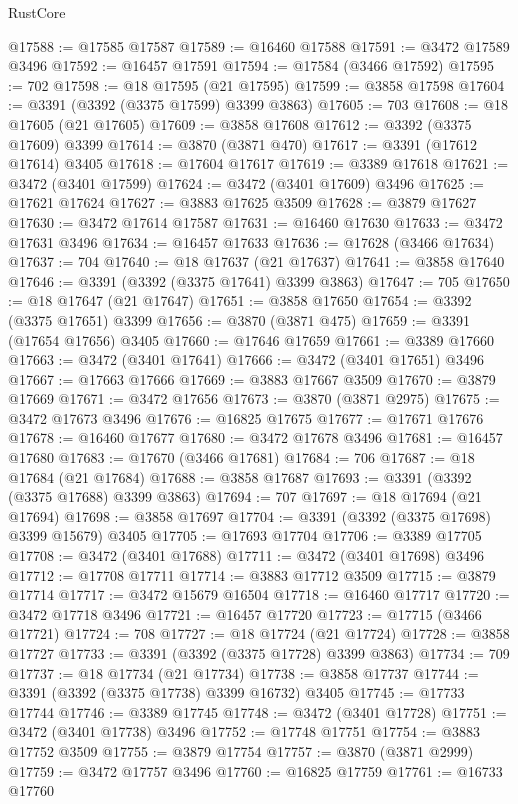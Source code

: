 \begin{lexlean}{RustCore}
\begin{coremodule}
@17588 := @17585 @17587
@17589 := @16460 @17588
@17591 := @3472 @17589 @3496
@17592 := @16457 @17591
@17594 := @17584 (@3466 @17592)
@17595 := 702
@17598 := @18 @17595 (@21 @17595)
@17599 := @3858 @17598
@17604 := @3391 (@3392 (@3375 @17599) @3399 @3863)
@17605 := 703
@17608 := @18 @17605 (@21 @17605)
@17609 := @3858 @17608
@17612 := @3392 (@3375 @17609) @3399
@17614 := @3870 (@3871 @470)
@17617 := @3391 (@17612 @17614) @3405
@17618 := @17604 @17617
@17619 := @3389 @17618
@17621 := @3472 (@3401 @17599)
@17624 := @3472 (@3401 @17609) @3496
@17625 := @17621 @17624
@17627 := @3883 @17625 @3509
@17628 := @3879 @17627
@17630 := @3472 @17614 @17587
@17631 := @16460 @17630
@17633 := @3472 @17631 @3496
@17634 := @16457 @17633
@17636 := @17628 (@3466 @17634)
@17637 := 704
@17640 := @18 @17637 (@21 @17637)
@17641 := @3858 @17640
@17646 := @3391 (@3392 (@3375 @17641) @3399 @3863)
@17647 := 705
@17650 := @18 @17647 (@21 @17647)
@17651 := @3858 @17650
@17654 := @3392 (@3375 @17651) @3399
@17656 := @3870 (@3871 @475)
@17659 := @3391 (@17654 @17656) @3405
@17660 := @17646 @17659
@17661 := @3389 @17660
@17663 := @3472 (@3401 @17641)
@17666 := @3472 (@3401 @17651) @3496
@17667 := @17663 @17666
@17669 := @3883 @17667 @3509
@17670 := @3879 @17669
@17671 := @3472 @17656
@17673 := @3870 (@3871 @2975)
@17675 := @3472 @17673 @3496
@17676 := @16825 @17675
@17677 := @17671 @17676
@17678 := @16460 @17677
@17680 := @3472 @17678 @3496
@17681 := @16457 @17680
@17683 := @17670 (@3466 @17681)
@17684 := 706
@17687 := @18 @17684 (@21 @17684)
@17688 := @3858 @17687
@17693 := @3391 (@3392 (@3375 @17688) @3399 @3863)
@17694 := 707
@17697 := @18 @17694 (@21 @17694)
@17698 := @3858 @17697
@17704 := @3391 (@3392 (@3375 @17698) @3399 @15679) @3405
@17705 := @17693 @17704
@17706 := @3389 @17705
@17708 := @3472 (@3401 @17688)
@17711 := @3472 (@3401 @17698) @3496
@17712 := @17708 @17711
@17714 := @3883 @17712 @3509
@17715 := @3879 @17714
@17717 := @3472 @15679 @16504
@17718 := @16460 @17717
@17720 := @3472 @17718 @3496
@17721 := @16457 @17720
@17723 := @17715 (@3466 @17721)
@17724 := 708
@17727 := @18 @17724 (@21 @17724)
@17728 := @3858 @17727
@17733 := @3391 (@3392 (@3375 @17728) @3399 @3863)
@17734 := 709
@17737 := @18 @17734 (@21 @17734)
@17738 := @3858 @17737
@17744 := @3391 (@3392 (@3375 @17738) @3399 @16732) @3405
@17745 := @17733 @17744
@17746 := @3389 @17745
@17748 := @3472 (@3401 @17728)
@17751 := @3472 (@3401 @17738) @3496
@17752 := @17748 @17751
@17754 := @3883 @17752 @3509
@17755 := @3879 @17754
@17757 := @3870 (@3871 @2999)
@17759 := @3472 @17757 @3496
@17760 := @16825 @17759
@17761 := @16733 @17760

\end{coremodule}
\end{lexlean}
